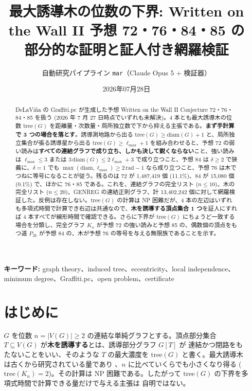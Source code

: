 \documentclass[paper=a4,fontsize=10.5pt,jafontsize=10.5pt]{jlreq}
\title{最大誘導木の位数の下界: Written on the Wall II 予想 72・76・84・85 の部分的な証明と証人付き網羅検証}
\author{自動研究パイプライン \texttt{mar}（Claude Opus 5 + 検証器）}
\date{2026年07月28日}
\theoremstyle{plain}
\theoremstyle{definition}
\begin{document}
\maketitle

\begin{abstract}
DeLaViña の Graffiti.pc が生成した予想 Written on the Wall II Conjecture 72・76・84・85 を扱う (2026 年 7 月 27 日時点でいずれも未解決)。4 本とも最大誘導木の位数 $\mathrm{tree}(G)$ を距離量・次数量・局所独立数で下から抑える主張である。\textbf{まず手計算で 3 つの場合を落とす}。誘導測地路から出る $\mathrm{tree}(G) \ge \mathrm{diam}(G) + 1$ と、局所独立集合が張る誘導星から出る $\mathrm{tree}(G) \ge \ell_{\max} + 1$ を組み合わせると、予想 72 の弱い読みは\textbf{すべての連結グラフで成り立ち、しかも決して鋭くならない}こと、強い読みは $\ell_{\max} \le 3$ または $3\,\mathrm{diam}(G) \le 2\ell_{\max} + 3$ で成り立つこと、予想 84 は $\delta \ge 2$ で狭義に、$\delta = 1$ でも $\max(\mathrm{diam}, \ell_{\max}) \ge 2\,\mathrm{rad} - 1$ なら成り立つこと、予想 76 は木でつねに等号になることが従う。残るのは 72 が 1,487,419 個 (11.1\%)、84 が 15,080 個 (0.1\%) で、ほかに 76・85 である。これを、連結グラフの完全リスト ($n \le 10$)、木の完全リスト ($n \le 20$)、GENREG の連結正則グラフ、計 13,402,242 個に対して網羅検証した。反例は存在しない。$\mathrm{tree}(G)$ の計算は NP 困難だが、4 本の左辺はいずれも多項式時間で計算でき右辺は共通なので、\textbf{木を誘導する頂点集合 1 つ}を証人にすれば 4 本すべてが線形時間で確認できる。さらに下界が $\mathrm{tree}(G)$ にちょうど一致する場合を分類し、完全グラフ $K_n$ が予想 72 の強い読みと予想 85 の、偶数個の頂点をもつ道 $P_{2k}$ が予想 84 の、木が予想 76 の等号を与える無限族であることを示す。
\end{abstract}

\noindent\textbf{キーワード:} graph theory、induced tree、eccentricity、local independence、minimum degree、Graffiti.pc、open problem、certificate


\section{はじめに}

$G$ を位数 $n = |V(G)| \ge 2$ の連結な単純グラフとする。頂点部分集合
$T \subseteq V(G)$ が\textbf{木を誘導する}とは、誘導部分グラフ $G[T]$ が
連結かつ閉路をもたないことをいい、そのような $T$ の最大濃度を
$\mathrm{tree}(G)$ と書く。最大誘導木は古くから研究されている量であり
\cite{ess1986}、$n$ に比べていくらでも小さくなり得る
($\mathrm{tree}(K_n) = 2$)。その計算は NP 困難である。したがって
$\mathrm{tree}(G)$ の下界を多項式時間で計算できる量だけで与える主張は
自明ではない。
\end{document}
